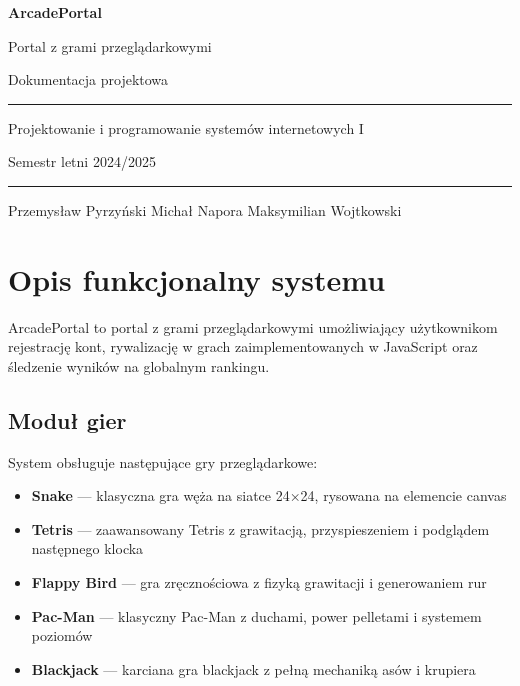 \documentclass[12pt,a4paper]{article}
\begin{document}
\begin{titlepage}
  \centering
  \vspace*{2cm}
  {\Huge\bfseries\color{headerblue} ArcadePortal\par}
  \vspace{0.5cm}
  {\Large Portal z grami przeglądarkowymi\par}
  \vspace{0.3cm}
  {\large Dokumentacja projektowa\par}
  \vspace{2cm}
  \rule{\textwidth}{0.4pt}
  \vspace{0.5cm}
  {\normalsize Projektowanie i programowanie systemów internetowych I\par}
  {\normalsize Semestr letni 2024/2025\par}
  \vspace{0.5cm}
  \rule{\textwidth}{0.4pt}
  \vspace{1.5cm}
  {\large Przemysław Pyrzyński \quad Michał Napora \quad Maksymilian Wojtkowski\par}
  \vfill
\end{titlepage}

\tableofcontents
\newpage

\section{Opis funkcjonalny systemu}

ArcadePortal to portal z grami przeglądarkowymi umożliwiający użytkownikom rejestrację kont,
rywalizację w grach zaimplementowanych w JavaScript oraz śledzenie wyników na globalnym rankingu.

\subsection{Moduł gier}

System obsługuje następujące gry przeglądarkowe:

\begin{itemize}[leftmargin=1.5cm]
  \item \textbf{Snake} --- klasyczna gra węża na siatce 24×24, rysowana na elemencie canvas
  \item \textbf{Tetris} --- zaawansowany Tetris z grawitacją, przyspieszeniem i podglądem następnego klocka
  \item \textbf{Flappy Bird} --- gra zręcznościowa z fizyką grawitacji i generowaniem rur
  \item \textbf{Pac-Man} --- klasyczny Pac-Man z duchami, power pelletami i systemem poziomów
  \item \textbf{Blackjack} --- karciana gra blackjack z pełną mechaniką asów i krupiera
\end{itemize}
\end{document}
